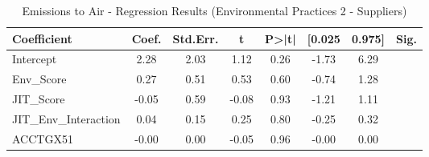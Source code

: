 \begin{table}[htbp]
    \centering
    \caption{Emissions to Air - Regression Results (Environmental Practices 2 - Suppliers)}
    \label{tab:regression}
    \begin{tabular}{lccccccc}
\toprule
Coefficient & Coef. & Std.Err. & t & P>|t| & [0.025 & 0.975] & Sig. \\
\midrule
Intercept & 2.28 & 2.03 & 1.12 & 0.26 & -1.73 & 6.29 &  \\
Env\_Score & 0.27 & 0.51 & 0.53 & 0.60 & -0.74 & 1.28 &  \\
JIT\_Score & -0.05 & 0.59 & -0.08 & 0.93 & -1.21 & 1.11 &  \\
JIT\_Env\_Interaction & 0.04 & 0.15 & 0.25 & 0.80 & -0.25 & 0.32 &  \\
ACCTGX51 & -0.00 & 0.00 & -0.05 & 0.96 & -0.00 & 0.00 &  \\
\bottomrule
\end{tabular}

    \end{table}
    